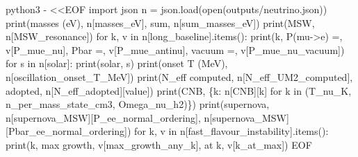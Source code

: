 \documentclass[
  10pt,
]{article}
\newenvironment{Shaded}{}{}
\newcommand{\NormalTok}[1]{#1}
\begin{document}
\begin{Shaded}
\begin{Highlighting}[]
\NormalTok{python3 {-} \textless{}\textless{}\textquotesingle{}EOF\textquotesingle{}}
\NormalTok{import json}
\NormalTok{n = json.load(open(\textquotesingle{}outputs/neutrino.json\textquotesingle{}))}
\NormalTok{print(\textquotesingle{}masses (eV)\textquotesingle{}, n[\textquotesingle{}masses\_eV\textquotesingle{}], \textquotesingle{} sum\textquotesingle{}, n[\textquotesingle{}sum\_masses\_eV\textquotesingle{}])}
\NormalTok{print(\textquotesingle{}MSW\textquotesingle{}, n[\textquotesingle{}MSW\_resonance\textquotesingle{}])}
\NormalTok{for k, v in n[\textquotesingle{}long\_baseline\textquotesingle{}].items():}
\NormalTok{    print(k, \textquotesingle{}P(mu{-}\textgreater{}e) =\textquotesingle{}, v[\textquotesingle{}P\_mue\_nu\textquotesingle{}], \textquotesingle{} Pbar =\textquotesingle{}, v[\textquotesingle{}P\_mue\_antinu\textquotesingle{}], \textquotesingle{} vacuum =\textquotesingle{}, v[\textquotesingle{}P\_mue\_nu\_vacuum\textquotesingle{}])}
\NormalTok{for s in n[\textquotesingle{}solar\textquotesingle{}]:}
\NormalTok{    print(\textquotesingle{}solar\textquotesingle{}, s)}
\NormalTok{print(\textquotesingle{}onset T (MeV)\textquotesingle{}, n[\textquotesingle{}oscillation\_onset\_T\_MeV\textquotesingle{}])}
\NormalTok{print(\textquotesingle{}N\_eff computed\textquotesingle{}, n[\textquotesingle{}N\_eff\_UM2\_computed\textquotesingle{}], \textquotesingle{} adopted\textquotesingle{}, n[\textquotesingle{}N\_eff\_adopted\textquotesingle{}][\textquotesingle{}value\textquotesingle{}])}
\NormalTok{print(\textquotesingle{}CNB\textquotesingle{}, \{k: n[\textquotesingle{}CNB\textquotesingle{}][k] for k in (\textquotesingle{}T\_nu\_K\textquotesingle{}, \textquotesingle{}n\_per\_mass\_state\_cm3\textquotesingle{}, \textquotesingle{}Omega\_nu\_h2\textquotesingle{})\})}
\NormalTok{print(\textquotesingle{}supernova\textquotesingle{}, n[\textquotesingle{}supernova\_MSW\textquotesingle{}][\textquotesingle{}P\_ee\_normal\_ordering\textquotesingle{}], n[\textquotesingle{}supernova\_MSW\textquotesingle{}][\textquotesingle{}Pbar\_ee\_normal\_ordering\textquotesingle{}])}
\NormalTok{for k, v in n[\textquotesingle{}fast\_flavour\_instability\textquotesingle{}].items():}
\NormalTok{    print(k, \textquotesingle{} max growth\textquotesingle{}, v[\textquotesingle{}max\_growth\_any\_k\textquotesingle{}], \textquotesingle{} at k\textquotesingle{}, v[\textquotesingle{}k\_at\_max\textquotesingle{}])}
\NormalTok{EOF}
\end{Highlighting}
\end{Shaded}
\end{document}
